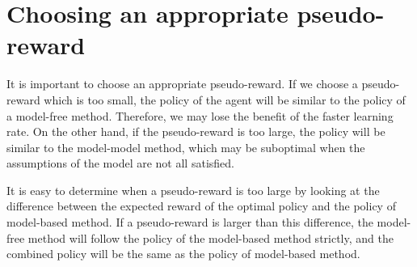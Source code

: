 



\section{Choosing an appropriate pseudo-reward}
It is important to choose an appropriate pseudo-reward. If we choose a pseudo-reward which is too small, 
the policy of the agent will be similar to the policy of a model-free method. Therefore, we may lose the 
benefit of the faster learning rate. On the other hand, if the pseudo-reward is too large, 
the policy will be similar to the model-model method, which may be suboptimal
when the assumptions of the model are not all satisfied.

It is easy to determine when a pseudo-reward is too large by
looking at the difference between the expected reward of the optimal policy and the policy of model-based method.
If a pseudo-reward is larger than this difference, the model-free method will follow the policy
of the model-based method strictly, and the combined policy will be the same as 
the policy of model-based method.

